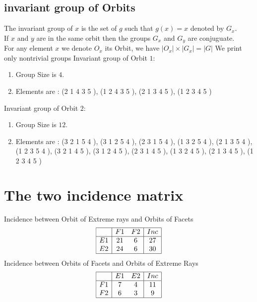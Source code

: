 \documentclass[12pt]{article}
\begin{document}
\subsection{invariant group of Orbits}
\noindent The invariant group of $x$ is the set of $g$ such that $g(x)=x$ denoted by $G_x$.\\
If $x$ and $y$ are in the same orbit then the groups $G_x$ and  $G_y$ are conjuguate.\\
For any element $x$ we denote $O_x$ its Orbit, we have $|O_x|\times |G_x|=|G|$
We print only nontrivial groups
Invariant group of Orbit $1$:
\begin{enumerate}
\item Group Size is $4$.
\item Elements are : (2 1 4 3 5  ), (1 2 4 3 5  ), (2 1 3 4 5  ), (1 2 3 4 5  )
\end{enumerate}
Invariant group of Orbit $2$:
\begin{enumerate}
\item Group Size is $12$.
\item Elements are : (3 2 1 5 4  ), (3 1 2 5 4  ), (2 3 1 5 4  ), (1 3 2 5 4  ), (2 1 3 5 4  ), (1 2 3 5 4  ), (3 2 1 4 5  ), (3 1 2 4 5  ), (2 3 1 4 5  ), (1 3 2 4 5  ), (2 1 3 4 5  ), (1 2 3 4 5  )
\end{enumerate}
\section{The two incidence matrix}
Incidence between Orbit of Extreme rays and Orbits of Facets
\begin{equation*}
\begin{array}{|c|cc|c|}
\hline
&F1&F2&Inc\\
\hline
E1&21&6&27\\
E2&24&6&30\\
\hline
\end{array}
\end{equation*}
Incidence between Orbits of Facets and Orbits of Extreme Rays
\begin{equation*}
\begin{array}{|c|cc|c|}
\hline
&E1&E2&Inc\\
\hline
F1&7&4&11\\
F2&6&3&9\\
\hline
\end{array}
\end{equation*}
\end{document}
